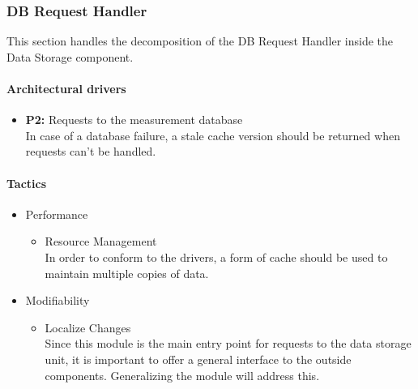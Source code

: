 \subsubsection{DB Request Handler}
This section handles the decomposition of the DB Request Handler inside the Data Storage component.
\paragraph{Architectural drivers}
\begin{itemize}
	\item \textbf{P2: } Requests to the measurement database\\
	In case of a database failure, a stale cache version should be returned when requests can't be handled.
\end{itemize}
\paragraph{Tactics}
\begin{itemize}
	\item Performance 
	\begin{itemize}
		\item Resource Management \\
		In order to conform to the drivers, a form of cache should be used to maintain multiple copies of data. 
	\end{itemize}
	\item Modifiability 
	\begin{itemize}
		\item Localize Changes \\
		Since this module is the main entry point for requests to the data storage unit, it is important to offer a general interface to the outside components. Generalizing the module will address this.
	\end{itemize}
\end{itemize}

